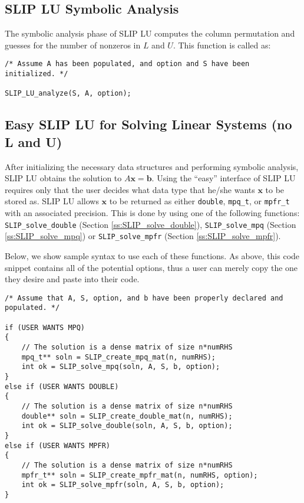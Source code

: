\documentclass[11pt]{article}
\theoremstyle{definition}
\begin{document}
\cprotect\subsection{SLIP LU Symbolic Analysis} \label{s:Using:symb}

The symbolic analysis phase of SLIP LU computes the column permutation and guesses for the number of nonzeros in $L$ and $U$. This function is called as:

\begin{verbatim}
/* Assume A has been populated, and option and S have been initialized. */

SLIP_LU_analyze(S, A, option);
\end{verbatim}

\cprotect\subsection{Easy SLIP LU for Solving Linear Systems (no L and U)} \label{s:Using:easy}

After initializing the necessary data structures and performing symbolic analysis, SLIP LU obtains the solution to $A \mathbf{x} = \mathbf{b}$. Using the ``easy'' interface of SLIP LU requires only that the user decides what data type that he/she wants $\mathbf{x}$ to be stored as. SLIP LU allows $\mathbf{x}$ to be returned as either \verb|double|, \verb|mpq_t|, or \verb|mpfr_t| with an associated precision. This is done by using one of the following functions: \verb|SLIP_solve_double| (Section \ref{ss:SLIP_solve_double}), \verb|SLIP_solve_mpq| (Section \ref{ss:SLIP_solve_mpq}) or \verb|SLIP_solve_mpfr| (Section \ref{ss:SLIP_solve_mpfr}).

Below, we show sample syntax to use each of these functions. As above, this code snippet contains all of the potential options, thus a user can merely copy the one they desire and paste into their code.

\begin{verbatim}
/* Assume that A, S, option, and b have been properly declared and populated. */

if (USER WANTS MPQ)
{
    // The solution is a dense matrix of size n*numRHS
    mpq_t** soln = SLIP_create_mpq_mat(n, numRHS);
    int ok = SLIP_solve_mpq(soln, A, S, b, option);
}
else if (USER WANTS DOUBLE)
{
    // The solution is a dense matrix of size n*numRHS
    double** soln = SLIP_create_double_mat(n, numRHS);
    int ok = SLIP_solve_double(soln, A, S, b, option);
}
else if (USER WANTS MPFR)
{
    // The solution is a dense matrix of size n*numRHS
    mpfr_t** soln = SLIP_create_mpfr_mat(n, numRHS, option);
    int ok = SLIP_solve_mpfr(soln, A, S, b, option);
}

\end{verbatim}
\end{document}
